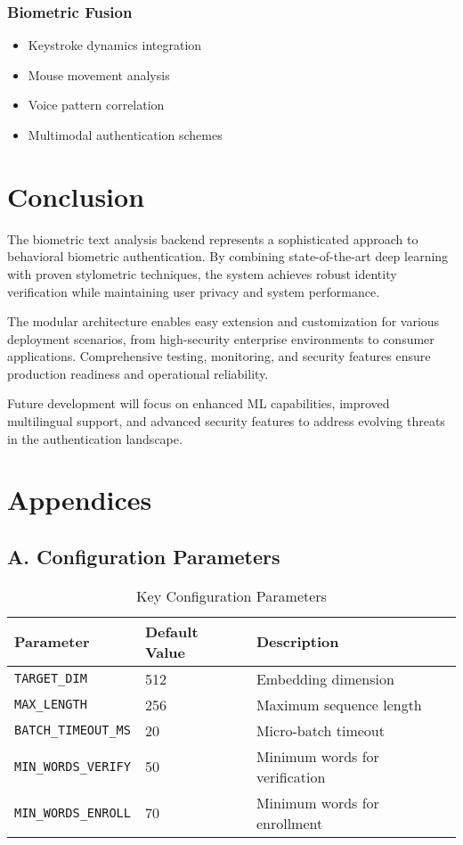 \documentclass[12pt,a4paper]{article}
\begin{document}
\subsubsection{Biometric Fusion}
\begin{itemize}
    \item Keystroke dynamics integration
    \item Mouse movement analysis
    \item Voice pattern correlation
    \item Multimodal authentication schemes
\end{itemize}

\section{Conclusion}

The biometric text analysis backend represents a sophisticated approach to behavioral biometric authentication. By combining state-of-the-art deep learning with proven stylometric techniques, the system achieves robust identity verification while maintaining user privacy and system performance.

The modular architecture enables easy extension and customization for various deployment scenarios, from high-security enterprise environments to consumer applications. Comprehensive testing, monitoring, and security features ensure production readiness and operational reliability.

Future development will focus on enhanced ML capabilities, improved multilingual support, and advanced security features to address evolving threats in the authentication landscape.

\section*{Appendices}

\subsection*{A. Configuration Parameters}

\begin{table}[h]
\centering
\begin{tabular}{@{}lll@{}}
\toprule
Parameter & Default Value & Description \\ \midrule
\texttt{TARGET\_DIM} & 512 & Embedding dimension \\
\texttt{MAX\_LENGTH} & 256 & Maximum sequence length \\
\texttt{BATCH\_TIMEOUT\_MS} & 20 & Micro-batch timeout \\
\texttt{MIN\_WORDS\_VERIFY} & 50 & Minimum words for verification \\
\texttt{MIN\_WORDS\_ENROLL} & 70 & Minimum words for enrollment \\
\bottomrule
\end{tabular}
\caption{Key Configuration Parameters}
\end{table}
\end{document}
